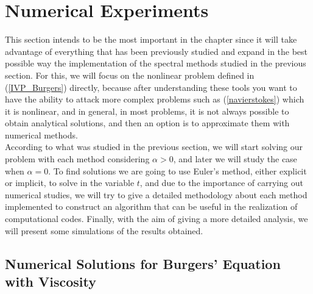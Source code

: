 \section{Numerical Experiments}
	
	This section intends to be the most important in the chapter since it will take advantage of everything that has been previously studied and expand in the best possible way the implementation of the spectral methods studied in the previous section. For this, we will focus on the nonlinear problem defined in (\ref{IVP_Burgers}) directly, because after understanding these tools you want to have the ability to attack more complex problems such as (\ref{navierstokes}) which it is nonlinear, and in general, in most problems, it is not always possible to obtain analytical solutions, and then an option is to approximate them with numerical methods. \\
	
	According to what was studied in the previous section, we will start solving our problem with each method considering $\alpha> 0$, and later we will study the case when $\alpha = 0$. To find solutions we are going to use Euler's method, either explicit or implicit, to solve in the variable $t$, and due to the importance of carrying out numerical studies, we will try to give a detailed methodology about each method implemented to construct an algorithm that can be useful in the realization of computational codes. Finally, with the aim of giving a more detailed analysis, we will present some simulations of the results obtained.
	
	\subsection{Numerical Solutions for Burgers' Equation with Viscosity}
	
	
	